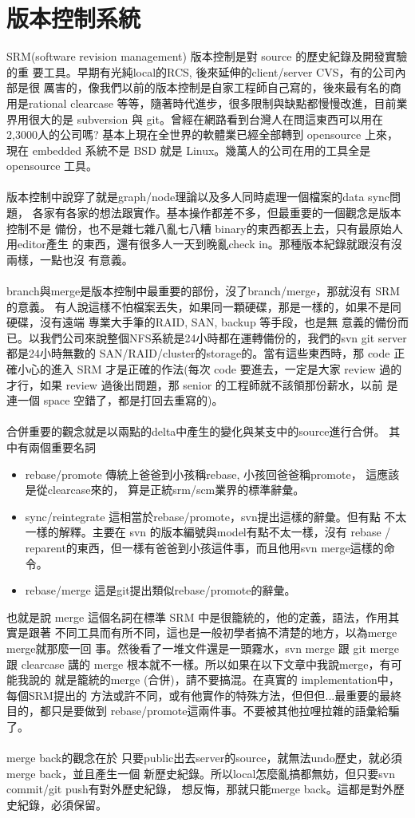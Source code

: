 \chapter{版本控制系統}
SRM(software revision management) 版本控制是對 source 的歷史紀錄及開發實驗的重
要工具。早期有光純local的RCS, 後來延伸的client/server CVS，有的公司內部是很
厲害的，像我們以前的版本控制是自家工程師自己寫的，後來最有名的商用是rational
clearcase 等等，隨著時代進步，很多限制與缺點都慢慢改進，目前業界用很大的是
subversion 與 git。曾經在網路看到台灣人在問這東西可以用在2,3000人的公司嗎?
基本上現在全世界的軟體業已經全部轉到 opensource 上來，
現在 embedded 系統不是 BSD 就是 Linux。幾萬人的公司在用的工具全是 opensource
工具。
\\\\
版本控制中說穿了就是graph/node理論以及多人同時處理一個檔案的data sync問題，
各家有各家的想法跟實作。基本操作都差不多，但最重要的一個觀念是版本控制不是
備份，也不是雜七雜八亂七八糟 binary的東西都丟上去，只有最原始人用editor產生
的東西，還有很多人一天到晚亂check in。那種版本紀錄就跟沒有沒兩樣，一點也沒
有意義。
\\\\
branch與merge是版本控制中最重要的部份，沒了branch/merge，那就沒有 SRM 的意義。
有人說這樣不怕檔案丟失，如果同一顆硬碟，那是一樣的，如果不是同硬碟，沒有遠端
專業大手筆的RAID, SAN, backup 等手段，也是無
意義的備份而已。以我們公司來說整個NFS系統是24小時都在運轉備份的，我們的svn
git server 都是24小時無數的 SAN/RAID/cluster的storage的。當有這些東西時，那
code 正確小心的進入 SRM 才是正確的作法(每次 code 要進去，一定是大家 review 
過的才行，如果 review 過後出問題，那 senior 的工程師就不該領那份薪水，以前
是連一個 space 空錯了，都是打回去重寫的)。
\\\\
合併重要的觀念就是以兩點的delta中產生的變化與某支中的source進行合併。
其中有兩個重要名詞
\begin{itemize}
  \item rebase/promote 傳統上爸爸到小孩稱rebase, 小孩回爸爸稱promote，
    這應該是從clearcase來的， 算是正統srm/scm業界的標準辭彙。
  \item sync/reintegrate 這相當於rebase/promote，svn提出這樣的辭彙。但有點
    不太一樣的解釋。主要在 svn 的版本編號與model有點不太一樣，沒有 rebase 
    / reparent的東西，但一樣有爸爸到小孩這件事，而且他用svn merge這樣的命令。
  \item rebase/merge 這是git提出類似rebase/promote的辭彙。
\end{itemize}
也就是說 merge 這個名詞在標準 SRM 中是很籠統的，他的定義，語法，作用其實是跟著
不同工具而有所不同，這也是一般初學者搞不清楚的地方，以為merge merge就那麼一回
事。然後看了一堆文件還是一頭霧水，svn merge 跟 git merge 跟 clearcase 講的 merge
根本就不一樣。所以如果在以下文章中我說merge，有可能我說的
就是籠統的merge (合併)，請不要搞混。在真實的 implementation中，每個SRM提出的
方法或許不同，或有他實作的特殊方法，但但但...最重要的最終目的，都只是要做到
rebase/promote這兩件事。不要被其他拉哩拉雜的語彙給騙了。
\\\\
merge back的觀念在於
只要public出去server的source，就無法undo歷史，就必須merge back，並且產生一個
新歷史紀錄。所以local怎麼亂搞都無妨，但只要svn commit/git push有對外歷史紀錄，
想反悔，那就只能merge back。這都是對外歷史紀錄，必須保留。
